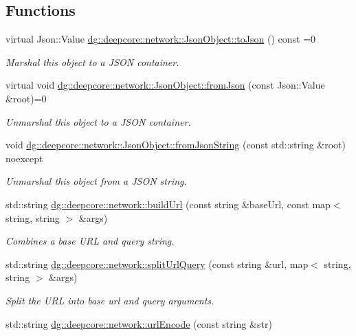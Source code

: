 \subsection*{Functions}
\begin{DoxyCompactItemize}
\item 
virtual Json\+::\+Value \hyperlink{group___network_module_ga96e3f7817a3257d80034811a9545f3ff}{dg\+::deepcore\+::network\+::\+Json\+Object\+::to\+Json} () const =0
\begin{DoxyCompactList}\small\item\em Marshal this object to a J\+S\+ON container. \end{DoxyCompactList}\item 
virtual void \hyperlink{group___network_module_ga74a2303be2ae11e8d94101b55154362e}{dg\+::deepcore\+::network\+::\+Json\+Object\+::from\+Json} (const Json\+::\+Value \&root)=0
\begin{DoxyCompactList}\small\item\em Unmarshal this object to a J\+S\+ON container. \end{DoxyCompactList}\item 
void \hyperlink{group___network_module_ga72539fce4a3396cb0e2adcb65fe911d8}{dg\+::deepcore\+::network\+::\+Json\+Object\+::from\+Json\+String} (const std\+::string \&root) noexcept
\begin{DoxyCompactList}\small\item\em Unmarshal this object from a J\+S\+ON string. \end{DoxyCompactList}\item 
std\+::string \hyperlink{group___network_module_ga0da8fb7d0201ab9eb336b86047a4cbf6}{dg\+::deepcore\+::network\+::build\+Url} (const string \&base\+Url, const map$<$ string, string $>$ \&args)
\begin{DoxyCompactList}\small\item\em Combines a base U\+RL and query string. \end{DoxyCompactList}\item 
std\+::string \hyperlink{group___network_module_ga39931550a7bb4a32d7fd6ef6bc3e4a14}{dg\+::deepcore\+::network\+::split\+Url\+Query} (const string \&url, map$<$ string, string $>$ \&args)
\begin{DoxyCompactList}\small\item\em Split the U\+RL into base url and query arguments. \end{DoxyCompactList}\item 
std\+::string \hyperlink{group___network_module_gaaa9055eea94c920782da31b4136243e7}{dg\+::deepcore\+::network\+::url\+Encode} (const string \&str)

\end{DoxyCompactItemize}
